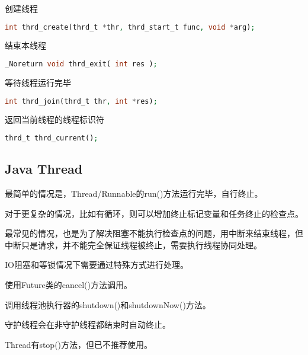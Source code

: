 \begin{compactitem}
\item 创建线程

\begin{lstlisting}[language=PHP]
int thrd_create(thrd_t *thr, thrd_start_t func, void *arg);
\end{lstlisting}


\item 结束本线程

\begin{lstlisting}[language=PHP]
_Noreturn void thrd_exit( int res );
\end{lstlisting}

\item 等待线程运行完毕

\begin{lstlisting}[language=PHP]
int thrd_join(thrd_t thr, int *res);
\end{lstlisting}

\item 返回当前线程的线程标识符

\begin{lstlisting}[language=PHP]
thrd_t thrd_current();
\end{lstlisting}
\end{compactitem}

\subsection{Java Thread}

\begin{compactitem}
\item 最简单的情况是，Thread/Runnable的run()方法运行完毕，自行终止。
\item 对于更复杂的情况，比如有循环，则可以增加终止标记变量和任务终止的检查点。
\item 最常见的情况，也是为了解决阻塞不能执行检查点的问题，用中断来结束线程，但中断只是请求，并不能完全保证线程被终止，需要执行线程协同处理。
\item IO阻塞和等锁情况下需要通过特殊方式进行处理。
\item 使用Future类的cancel()方法调用。
\item 调用线程池执行器的shutdown()和shutdownNow()方法。
\item 守护线程会在非守护线程都结束时自动终止。
\item Thread有stop()方法，但已不推荐使用。
\end{compactitem}



